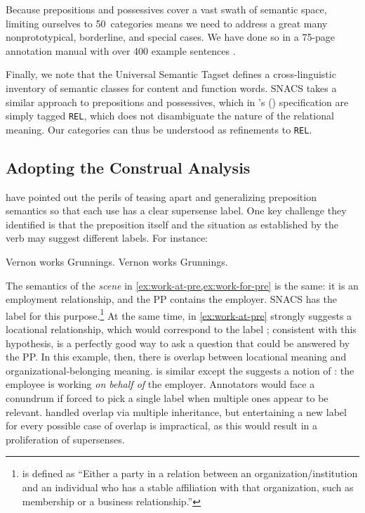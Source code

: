 \pdfoutput=1 \documentclass[11pt,a4paper]{article}
\newcommand{\citeposs}[2][]{\citeauthor{#2}'s (\citeyear[#1]{#2})}
\begin{document}
Because prepositions and possessives cover a vast swath of semantic space, 
limiting ourselves to 50~categories means we need to address a great many 
nonprototypical, borderline, and special cases. 
We have done so in a 75-page annotation manual with over 400 example sentences \citep{schneider-18-arxiv}. 

Finally, we note that the Universal Semantic Tagset \citep{abzianidze-17}
defines a cross-linguistic inventory of semantic classes for content and function words. 
SNACS takes a similar approach to prepositions and possessives, 
which in \citeposs{abzianidze-17} specification
are simply tagged \texttt{REL}, 
which does not disambiguate the nature of the relational meaning.
Our categories can thus be understood as refinements to \texttt{REL}.



\subsection{Adopting the Construal Analysis} \label{sec:construal-analysis}



 have pointed out the perils of teasing apart and generalizing preposition semantics so that each use has a clear supersense label. 
One key challenge they identified is that the preposition itself and the situation as established by the verb may suggest different labels. For instance:
\begin{exe}
\ex \label{ex:work} \begin{xlist}
   \ex\label{ex:work-at-pre} Vernon works  Grunnings. \ex\label{ex:work-for-pre} Vernon works  Grunnings. \end{xlist}
\end{exe}
The semantics of the \emph{scene} in \cref{ex:work-at-pre,ex:work-for-pre} is the same: 
it is an employment relationship, and the PP contains the employer. 
SNACS has the label  for this purpose.\footnote{ is defined as ``Either a party in a relation between an organization/institution and an individual who has a stable affiliation with that organization, such as membership or a business relationship.''}
At the same time,  in \cref{ex:work-at-pre} strongly suggests a locational relationship, which would correspond to the label ; 
consistent with this hypothesis,  is a perfectly good way 
to ask a question that could be answered by the PP. 
In this example, then, there is overlap between locational meaning and organizational-belonging meaning.
 is similar except the  suggests a notion of : the employee is working \emph{on behalf of} the employer. 
Annotators would face a conundrum if forced to pick a single label when multiple ones appear to be relevant.
\citet{schneider-16} handled overlap via multiple inheritance, but entertaining a new label for every possible case of overlap is impractical, as this would result in a proliferation of supersenses. 
\end{document}
